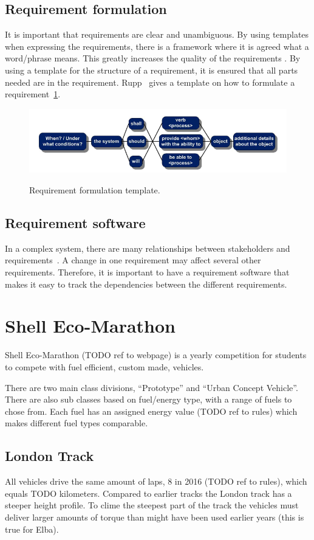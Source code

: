 \subsection{Requirement formulation}
It is important that requirements are clear and unambiguous. By using templates
when expressing the requirements, there is a framework where it is agreed what a
word/phrase means. This greatly increases the quality of the requirements
\cite{rupp2014}. By using a template for the structure of a requirement, it is
ensured that all parts needed are in the requirement. Rupp~\cite{rupp2014}
gives a template on how to formulate a requirement~\ref{fig:req_template}.
\begin{figure}[H]
    \centering
    \includegraphics[width=\textwidth]{./img/introduction_req_template.PNG}\label{fig:req_template}
    \caption{Requirement formulation template.}
\end{figure}
\subsection{Requirement software}
In a complex system, there are many relationships between stakeholders and
requirements~\cite{ibm_req}. A change in one requirement may affect several other
requirements. Therefore, it is important to have a requirement software that
makes it easy to track the dependencies between the different requirements.

\section{Shell Eco-Marathon}
Shell Eco-Marathon (TODO ref to webpage) is a yearly competition for students to compete with fuel efficient, custom made, vehicles.

There are two main class divisions, ``Prototype'' and ``Urban Concept
Vehicle''. There are also sub classes based on fuel/energy type, with a range
of fuels to chose from. Each fuel has an assigned energy value (TODO ref to
rules) which makes different fuel types comparable. 

\subsection{London Track}
All vehicles drive the same amount of laps, 8 in 2016 (TODO ref to rules), which equals TODO kilometers. Compared to earlier tracks the London track has a steeper height profile. To clime the steepest part of the track the vehicles must deliver larger amounts of torque than might have been used earlier years (this is true for Elba). 

